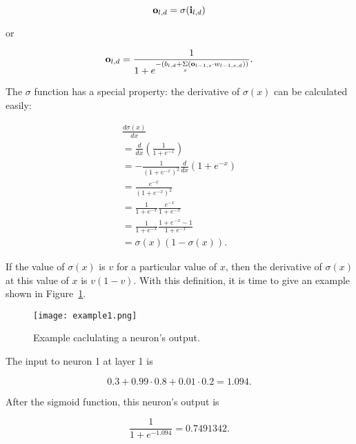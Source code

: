 \begin{equation}
\mathscr {\bf o}_{l, d}
= \sigma(\mathscr {\bf i}_{l,d})
\end{equation}

or

\begin{equation}
\mathscr {\bf o}_{l, d} = 
\frac{1}
{
  1 + e^
  {
    -(
        b_{l, d} + \underset{s} {\Sigma}
        (
           \mathscr {\bf o}_{l-1, s}
           \cdot
          w_{l-1, s, d}
        )
      )
  }
}.
\end{equation}

The $\sigma$ function has a special property: the derivative of
$\sigma(x)$ can be calculated easily:

\begin{equation}
\begin{array}{l}
\frac{d \sigma(x)}{d x} \\
=  \frac{d}{dx} (\frac{1}{1 + e^{-x}}) \\
= - \frac{1}{(1 + e^{-x})^2} \frac{d}{dx} (1 + e^{-x}) \\
=  \frac{e^{-x}}{(1 + e^{-x})^2} \\
= \frac{1}{1 + e^{-x}} \frac{e^{-x}}{1 + e^{-x}} \\
= \frac{1}{1 + e^{-x}} \frac{1 + e^{-x} - 1}{1 + e^{-x}} \\
= \sigma(x) (1 - \sigma(x)).
\end{array}
\label{eqn:derivativesigma}
\end{equation}

If the value of $\sigma(x)$ is $v$ for a particular
value of $x$, then the derivative of $\sigma(x)$ at this value of $x$
is $v (1-v)$.
With this definition, it is time to give an example shown in
Figure~\ref{fig:example1}.  
\begin{figure}[h]
\centering
{\texttt{[image: example1.png]}}
\caption{Example caclulating a neuron's output.}
  \label{fig:example1}
\end{figure}

The input to neuron 1 at layer 1 is

\begin{equation}
0.3 + 0.99 \cdot 0.8 + 0.01 \cdot 0.2 = 1.094.
\end{equation}

After the sigmoid function, this neuron's output is

\begin{equation}
\frac{1}{1+ e^{-1.094}} = 0.7491342.
\end{equation}

